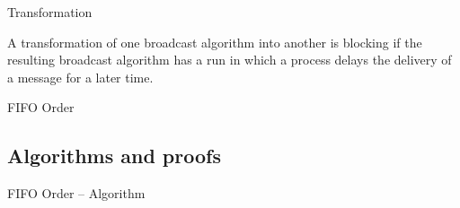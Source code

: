 \begin{frame}{Transformation}
	
\begin{definition}
A transformation of one broadcast algorithm into another is \alert{blocking}
if the resulting broadcast algorithm has a run in which a process delays the
delivery of a message for a later time.
\end{definition}

\begin{example}
FIFO Order
\end{example}

\end{frame}

\subsection{Algorithms and proofs}

\begin{frame}[shrink]{FIFO Order -- Algorithm}

\begin{Procedure}
\caption{FIFO Order Transformation executed by process $p$}

\BlankLine
{}
\BlankLine
{}
\end{Procedure}

\end{frame}


